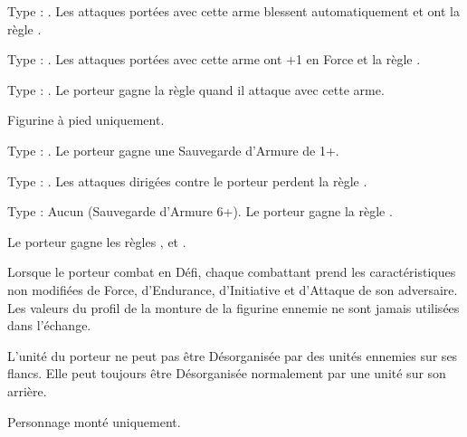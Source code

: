 Type : \hw{}. Les attaques portées avec cette arme blessent automatiquement et ont la règle .

Type : \hw{}. Les attaques portées avec cette arme ont +1 en Force et la règle \lightningreflexes{}.

Type : \gw{}. Le porteur gagne la règle \crushattack{} quand il attaque avec cette arme.

\endpricelist

\armymagicalarmour

\startpricelist

Figurine à pied uniquement.

Type : \platearmour{}. Le porteur gagne une Sauvegarde d'Armure de 1+.

Type : \platearmour{}. Les attaques dirigées contre le porteur perdent la règle .

Type : Aucun (Sauvegarde d'Armure 
6+). Le porteur gagne la règle \fear{}.

\endpricelist

\armytalismans

\startpricelist

Le porteur gagne les règles \distracting{}, \fireborn{} et .

\endpricelist

\armyenchanteditems

\startpricelist

Lorsque le porteur combat en Défi, chaque combattant prend les caractéristiques non modifiées de Force, d'Endurance, d'Initiative et d'Attaque de son adversaire. Les valeurs du profil de la monture de la figurine ennemie ne sont jamais utilisées dans l'échange.

\endpricelist

\armymagicalbanners

\startpricelist

L'unité du porteur ne peut pas être Désorganisée par des unités ennemies sur ses flancs. Elle peut toujours être Désorganisée normalement par une unité sur son arrière.

Personnage monté uniquement.

